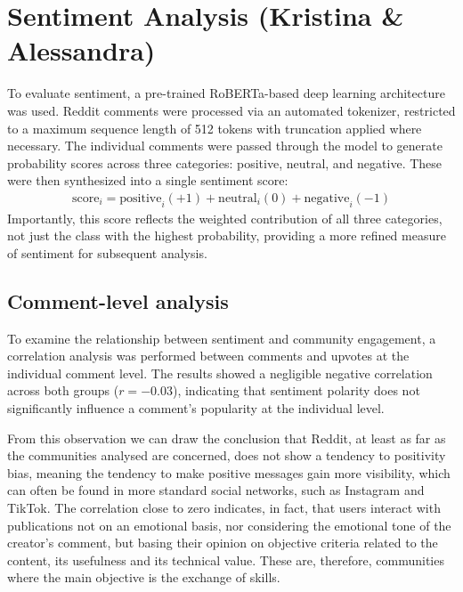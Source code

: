 \documentclass[conference]{IEEEtran}
\begin{document}
\section{Sentiment Analysis (Kristina \& Alessandra)}
To evaluate sentiment, a pre-trained RoBERTa-based deep learning architecture was used. Reddit comments were processed via an automated tokenizer, restricted to a maximum sequence length of 512 tokens with truncation applied where necessary. The individual comments were passed through the model to generate probability scores across three categories: positive, neutral, and negative. These were then synthesized into a single sentiment score:
\begin{align*}
    \text{score}_i = \text{positive}_i(+1) + \text{neutral}_i(0) + \text{negative}_i(-1)
\end{align*}
Importantly, this score reflects the weighted contribution of all three categories, not just the class with the highest probability, providing a more refined measure of sentiment for subsequent analysis.

\subsection{Comment-level analysis}
To examine the relationship between sentiment and community engagement, a correlation analysis was performed between comments and upvotes at the individual comment level. The results showed a negligible negative correlation across both groups ($r=-0.03$), indicating that sentiment polarity does not significantly influence a comment's popularity at the individual level.

From this observation we can draw the conclusion that Reddit, at least as far as the communities analysed are concerned, does not show a tendency to positivity bias, meaning the tendency to make positive messages gain more visibility, which can often be found in more standard social networks, such as Instagram and TikTok. The correlation close to zero indicates, in fact, that users interact with publications not on an emotional basis, nor considering the emotional tone of the creator's comment, but basing their opinion on objective criteria related to the content, its usefulness and its technical value. These are, therefore, communities where the main objective is the exchange of skills.
\end{document}
